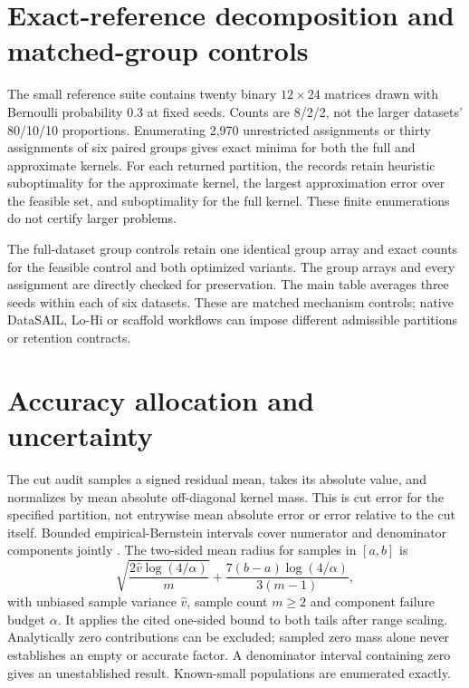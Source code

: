 \documentclass[12pt]{article}
\begin{document}
\section{Exact-reference decomposition and matched-group controls}

The small reference suite contains twenty binary $12\times24$ matrices drawn
with Bernoulli probability 0.3 at fixed seeds. Counts are 8/2/2, not the larger
datasets' 80/10/10 proportions. Enumerating 2,970 unrestricted assignments or
thirty assignments of six paired groups gives exact minima for both the full
and approximate kernels. For each returned partition, the records retain
heuristic suboptimality for the approximate kernel, the largest approximation
error over the feasible set, and suboptimality for the full kernel.
These finite enumerations do not certify larger problems.



The full-dataset group controls retain one identical group array and exact counts
for the feasible control and both optimized variants. The group arrays and every
assignment are directly checked for preservation. The main table averages three
seeds within each of six datasets. These are matched mechanism controls; native
DataSAIL, Lo-Hi or scaffold workflows can impose different admissible partitions
or retention contracts.

\section{Accuracy allocation and uncertainty}

The cut audit samples a signed residual mean, takes its absolute value, and
normalizes by mean absolute off-diagonal kernel mass. This is cut error for
the specified partition, not entrywise mean absolute error or error relative to
the cut itself. Bounded empirical-Bernstein intervals cover numerator and
denominator components jointly \citep{maurer2009empirical}.
The two-sided mean radius for samples in $[a,b]$ is
\[
 \sqrt{\frac{2\widehat v\log(4/\alpha)}{m}}
 +\frac{7(b-a)\log(4/\alpha)}{3(m-1)},
\]
with unbiased sample variance $\widehat v$, sample count $m\ge2$ and component
failure budget $\alpha$. It applies the cited one-sided bound to both tails
after range scaling. Analytically zero contributions can be excluded;
sampled zero mass alone never establishes an empty or accurate factor.
A denominator interval containing zero gives an unestablished result.
Known-small populations are enumerated exactly.
\end{document}
